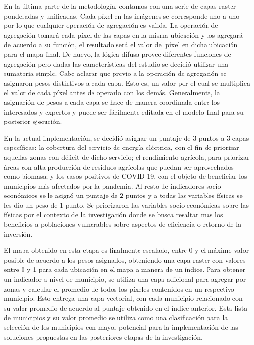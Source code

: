 En la última parte de la metodología, contamos con una serie de capas raster ponderadas y unificadas.  Cada píxel en las imágenes se corresponde uno a uno por 
lo que cualquier operación de agregación es valida.  La operación de agregación tomará cada píxel de las capas en la misma ubicación y los agregará de acuerdo 
a su función, el resultado será el valor del píxel en dicha ubicación para el mapa final.  De nuevo, la lógica difusa provee diferentes funciones de 
agregación pero dadas las características del estudio se decidió utilizar una sumatoria simple.  Cabe aclarar que previo a la operación de agregación se 
asignaron pesos distintivos a cada capa.  Esto es, un valor por el cual se multiplica el valor de cada píxel antes de operarlo con los demás.  Generalmente, la 
asignación de pesos a cada capa se hace de manera coordinada entre los interesados y expertos y puede ser fácilmente editada en el modelo final para su 
posterior ejecución.  

En la actual implementación, se decidió asignar un puntaje de 3 puntos a 3 capas específicas: la cobertura del servicio de energía eléctrica, con el fin de 
priorizar aquellas zonas con déficit de dicho servicio; el rendimiento agrícola, para priorizar áreas con alta producción de residuos agrícolas que puedan ser 
aprovechados como biomasa; y los casos positivos de COVID-19, con el objeto de beneficiar los municipios más afectados por la pandemia.  Al resto de 
indicadores socio-económicos se le asignó un puntaje de 2 puntos y a todas las variables físicas se les dio un peso de 1 punto.  Se priorizaron las variables 
socio-económicas sobre las físicas por el contexto de la investigación donde se busca resaltar mas los beneficios a poblaciones vulnerables sobre aspectos de 
eficiencia o retorno de la inversión.

El mapa obtenido en esta etapa es finalmente escalado, entre 0 y el máximo valor posible de acuerdo a los pesos asignados, obteniendo una capa raster con 
valores entre 0 y 1 para cada ubicación en el mapa a manera de un índice.  Para obtener un indicador a nivel de municipio, se utiliza una capa adicional para 
agregar por zonas y calcular el promedio de todos los píxeles contenidos en un respectivo municipio.  Esto entrega una capa vectorial, con cada municipio 
relacionado con su valor promedio de acuerdo al puntaje obtenido en el índice anterior.  Esta lista de municipios y su valor promedio se utiliza como una 
clasificación para la selección de los municipios con mayor potencial para la implementación de las soluciones propuestas en las posteriores etapas de la 
investigación.
